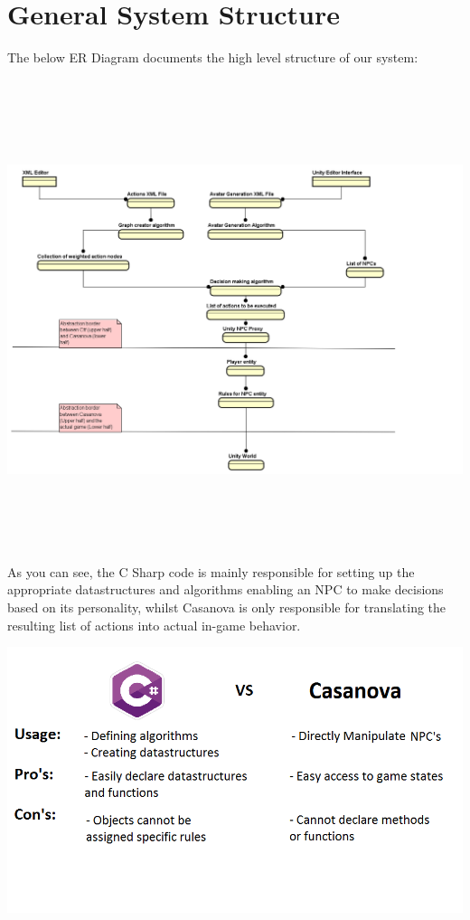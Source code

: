 \documentclass[11pt]{article} %
\begin{document}
\newpage
\section{General System Structure}
The below ER Diagram documents the high level structure of our system:

~\\
\includegraphics[width=20cm, height=13cm]{SystemEr}
~\\

\newpage
As you can see, the C Sharp code is mainly responsible for setting up the appropriate datastructures and algorithms enabling an NPC to make decisions based on its personality, whilst Casanova is only responsible for translating the resulting list of actions into actual in-game behavior. 

\includegraphics[scale=0.7]{CSHARPVSCASANOVA}
\end{document}
